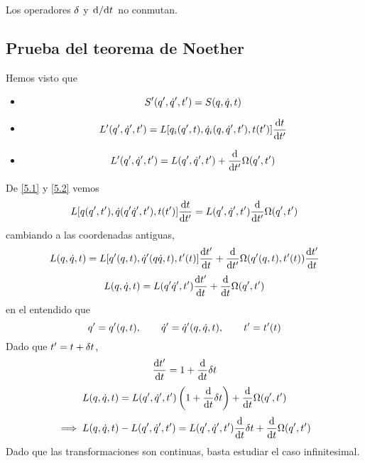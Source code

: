 \begin{prop}
	Los operadores $\delta$ y $\dv*{t}$ no conmutan.
\end{prop}

\subsection{Prueba del teorema de Noether
}
Hemos visto que
\begin{itemize}
	\item \begin{equation}
  S'(q',\dot{q}',t')=S(q,\dot{q},t)
\end{equation}

	\item \begin{equation}\label{5.1}
  L'(q',\dot{q}',t')=L[q_i(q',t),\dot{q}_i(q,\dot{q}',t'),t(t')]\dv{t}{t'}
\end{equation}

	\item \begin{equation}\label{5.2}
  L'(q',\dot{q}',t')=L(q',\dot{q}',t')+\dv{t'}\Omega(q',t')
\end{equation}
\end{itemize}
De \eqref{5.1} y \eqref{5.2} vemos
\begin{equation}
  L[q(q',t'),\dot{q}(q'\dot{q}',t'),t(t')]\dv{t}{t'}=L(q',\dot{q}',t')\dv{t'}\Omega(q',t')
\end{equation}
cambiando a las coordenadas antiguas,
\begin{equation}
  L(q,\dot{q},t)=L[q'(q,t),\dot{q}'(q\dot{q},t),t'(t)]\dv{t'}{t}+\dv{t'}\Omega(q'(q,t),t'(t))\dv{t'}{t}
\end{equation}
\begin{equation}
  L(q,\dot{q},t)=L(q'\dot{q}',t')\dv{t'}{t}+\dv{t}\Omega(q',t')
\end{equation}
en el entendido que
\begin{equation}
  q'=q'(q,t),\qquad \dot{q}'=\dot{q}'(q,\dot{q},t),\qquad t'=t'(t)
\end{equation}
Dado que $t'=t+\delta t$,
\begin{equation}
  \dv{t'}{t}=1+\dv{t}\delta t
\end{equation}
\begin{equation}
  L(q,\dot{q},t)=L(q',\dot{q}',t')\left(1+\dv{t}\delta t\right)+\dv{t}\Omega(q',t')
\end{equation}
\begin{equation}\label{5.flecha}
  \implies L(q,\dot{q},t)-L(q',\dot{q}',t')=L(q',\dot{q}',t')\dv{t}\delta t+\dv{t}\Omega(q',t')
\end{equation}
Dado que las transformaciones son continuas, basta estudiar el caso infinitesimal.

